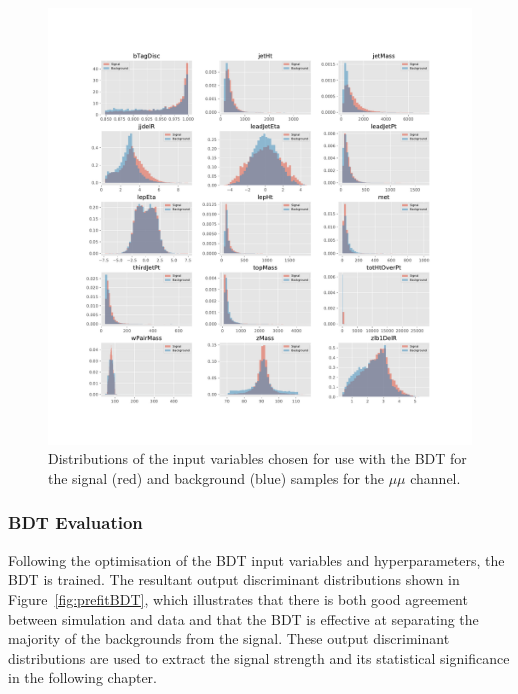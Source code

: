 \begin{figure}[htbp]
\centering
\vspace*{-3.25cm}\hspace*{-2.3cm}\includegraphics[width=1.27\textwidth]{figs/background-estimation/plots/vars_mumu.pdf}
\vspace*{-1cm}\caption{
Distributions of the input variables chosen for use with the BDT for the signal (red) and background (blue) samples for the $\mu\mu$ channel.}
\label{fig:inputFeaturesDistributions_mumu}
\end{figure}

\subsubsection*{BDT Evaluation}
Following the optimisation of the BDT input variables and hyperparameters, the BDT is trained.
The resultant output discriminant distributions shown in Figure~\ref{fig:prefitBDT}, which illustrates that there is both good agreement between simulation and data and that the BDT is effective at separating the majority of the backgrounds from the signal.
These output discriminant distributions are used to extract the signal strength and its statistical significance in the following chapter.

